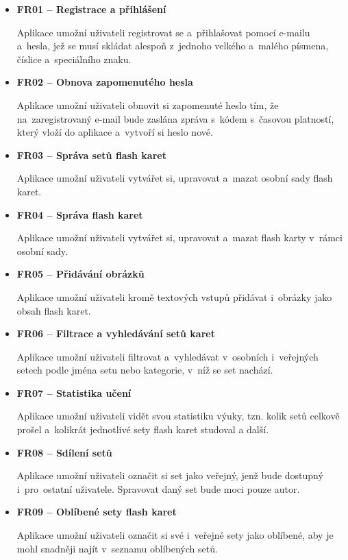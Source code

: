 \documentclass[twoside]{ctuthesis}
\begin{document}
\begin{itemize}
\item \textbf{FR01 -- Registrace a přihlášení} 

Aplikace umožní uživateli registrovat se a~přihlašovat pomocí e-mailu a~hesla, jež se musí skládat alespoň z~jednoho velkého a~malého písmena, číslice a~speciálního znaku.

\item \textbf{FR02 -- Obnova zapomenutého hesla}

Aplikace umožní uživateli obnovit si zapomenuté heslo tím, že na~zaregistrovaný e-mail bude zaslána zpráva s~kódem s~časovou platností, který vloží do aplikace a~vytvoří si heslo nové.

\item \textbf{FR03 -- Správa setů flash karet}

Aplikace umožní uživateli vytvářet si, upravovat a~mazat osobní sady flash karet.

\item \textbf{FR04 -- Správa flash karet}

Aplikace umožní uživateli vytvářet si, upravovat a~mazat flash karty v~rámci osobní sady.

\item \textbf{FR05 -- Přidávání obrázků}

Aplikace umožní uživateli kromě textových vstupů přidávat i~obrázky jako obsah flash karet.

\item \textbf{FR06 -- Filtrace a vyhledávání setů karet}

Aplikace umožní uživateli filtrovat a~vyhledávat v~osobních i~veřejných setech podle jména setu nebo kategorie, v~níž se set nachází.

\item \textbf{FR07 -- Statistika učení}

Aplikace umožní uživateli vidět svou statistiku výuky, tzn. kolik setů celkově prošel a~kolikrát jednotlivé sety flash karet studoval a další.

\item \textbf{FR08 -- Sdílení setů}

Aplikace umožní uživateli označit si set jako veřejný, jenž bude dostupný i~pro~ostatní uživatele. Spravovat daný set bude moci pouze autor. 

\item \textbf{FR09 -- Oblíbené sety flash karet}

Aplikace umožní uživateli označit si své i~veřejné sety jako oblíbené, aby je mohl snadněji najít v~seznamu oblíbených setů.


\end{itemize}
\end{document}
